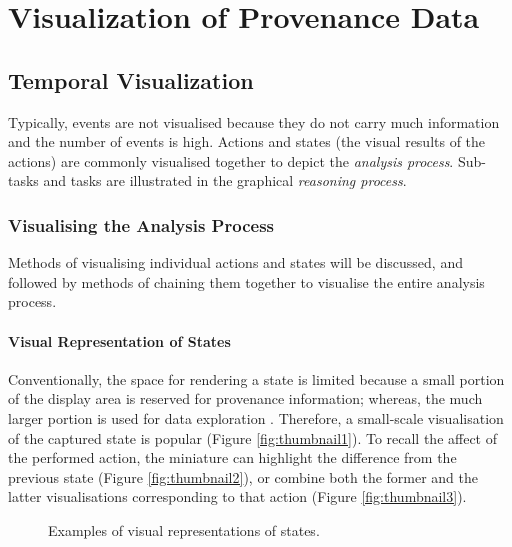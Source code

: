 \section{Visualization of Provenance Data}
\subsection{Temporal Visualization}
Typically, events are not visualised because they do not carry much information and the number of events is high. Actions and states (the visual results of the actions) are commonly visualised together to depict the \textit{analysis process}. Sub-tasks and tasks are illustrated in the graphical \textit{reasoning process}. 

\subsubsection{Visualising the Analysis Process}
Methods of visualising individual actions and states will be discussed, and followed by methods of chaining them together to visualise the entire analysis process. 

\paragraph{Visual Representation of States}
Conventionally, the space for rendering a state is limited because a small portion of the display area is reserved for provenance information; whereas, the much larger portion is used for data exploration \cite{Shrinivasan2008, Gotz2009, Kadivar2009}. Therefore, a small-scale visualisation of the captured state is popular \cite{Hightower1998} (Figure \ref{fig:thumbnail1}). To recall the affect of the performed action, the miniature can highlight the difference from the previous state \cite{Klemmer2002} (Figure \ref{fig:thumbnail2}), or combine both the former and the latter visualisations corresponding to that action \cite{Kurlander1988} (Figure \ref{fig:thumbnail3}).

\begin{figure}[ht]
\centering
{} \hspace{0.05cm}
 \hspace{0.05cm}
\caption{Examples of visual representations of states.}
\label{fig:State-Respresentation}
\end{figure}

